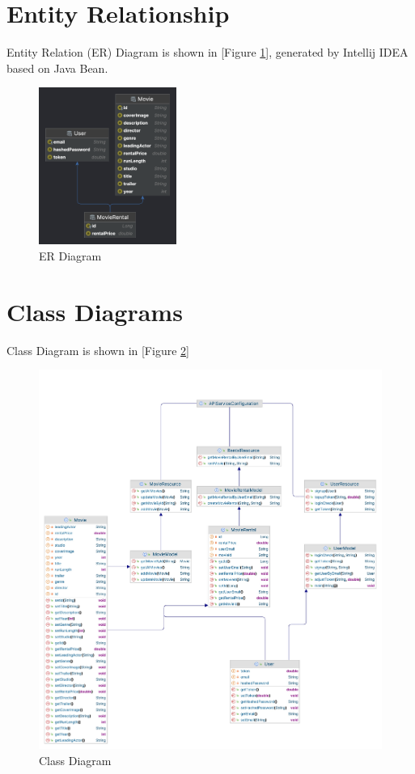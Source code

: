 \documentclass{article}
\begin{document}
\section{Entity Relationship}
Entity Relation (ER) Diagram is shown in [Figure \ref{fig:er}], generated by Intellij IDEA based on Java Bean.

\begin{figure}[!htp]
\centering
\includegraphics[width=0.4\textwidth]{er.png}
\caption{\label{fig:er}ER Diagram}
\end{figure}

\section{Class Diagrams}

Class Diagram is shown in [Figure \ref{fig:cls}]

\begin{figure}[!htp]
\centering
\includegraphics[width=1\textwidth]{class.jpg}
\caption{\label{fig:cls}Class Diagram}
\end{figure}
\end{document}
